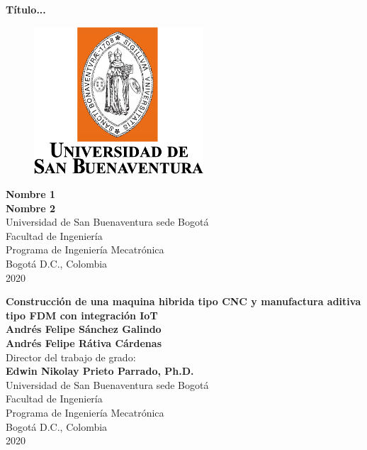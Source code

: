 \cleardoublepage

\thispagestyle{empty} 
\begin{center}
\textbf{ 
\huge{Título...}}\\[1.0cm]


\begin{figure}[htbp]
	\centering
		\includegraphics[height=5.5cm,keepaspectratio]{OtrosTex/LogoUSB}
\end{figure}

\vspace*{2.5cm} 
\Large\textbf{Nombre 1 \\ Nombre 2}\\[1.0cm]

\vspace*{2cm} 
\Large{Universidad de San Buenaventura sede Bogotá}\\
\Large{Facultad de Ingeniería}\\
\Large{Programa de Ingeniería Mecatrónica}\\
\large{Bogotá D.C., Colombia\\
2020}\\
\end{center}

\newpage{\pagestyle{empty}\cleardoublepage}
\newpage

\begin{center}
\thispagestyle{empty} \vspace*{0cm} \textbf{\huge
Construcción de una maquina hibrida tipo CNC y manufactura aditiva tipo FDM con integración IoT}\\[2cm]
\vspace*{1cm}
\Large\textbf{Andrés Felipe Sánchez Galindo \\ Andrés Felipe Rátiva Cárdenas }\\[2.5cm]
\large{Director del trabajo de grado:}\\%
\large\textbf{Edwin Nikolay Prieto Parrado, Ph.D.}\\[1.5cm]



\vspace*{2.5cm}
\Large{Universidad de San Buenaventura sede Bogotá}\\
\Large{Facultad de Ingeniería}\\
\Large{Programa de Ingeniería Mecatrónica}\\
\large{Bogotá D.C., Colombia\\
2020}\\
\end{center}


%
